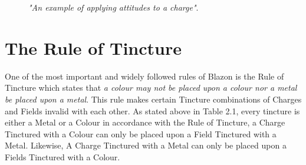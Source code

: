 
\begin{figure}[H]
\hfill
{}
\hfill
\caption{\emph{"An example of applying attitudes to a charge"}.}

\end{figure}



\section{The Rule of Tincture}
One of the most important and widely followed rules of Blazon is the Rule of Tincture which states that \emph{a colour may not be placed upon a colour nor a metal be placed upon a metal}\cite[p.46]{ruleofTincture}.  This rule makes certain Tincture combinations of Charges and Fields invalid with each other.  As stated above in Table 2.1, every tincture is either a Metal or a Colour in accordance with the Rule of Tincture, a Charge Tinctured with a Colour can only be placed upon a Field Tinctured with a Metal.  Likewise, A Charge Tinctured with a Metal can only be placed upon a Fields Tinctured with a Colour.  

